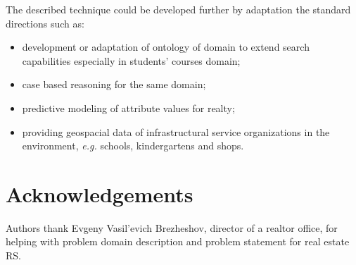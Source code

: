 \documentclass[conference,a4]{IEEEtran}
\begin{document}
The described technique could be developed further by adaptation the standard directions such as:
\begin{itemize}
  \item development or adaptation of ontology of domain to extend search capabilities especially in students' courses domain;
  \item case based reasoning for the same domain;
  \item predictive modeling of attribute values for realty;
  \item providing geospacial data of infrastructural service organizations in the environment, \emph{e.g.} schools, kindergartens and shops.
\end{itemize}

\section*{Acknowledgements}
\label{sec:ack}

Authors thank Evgeny Vasil'evich Brezheshov, director of a realtor office, for helping with problem domain description and problem statement for real estate RS.

\end{document}
